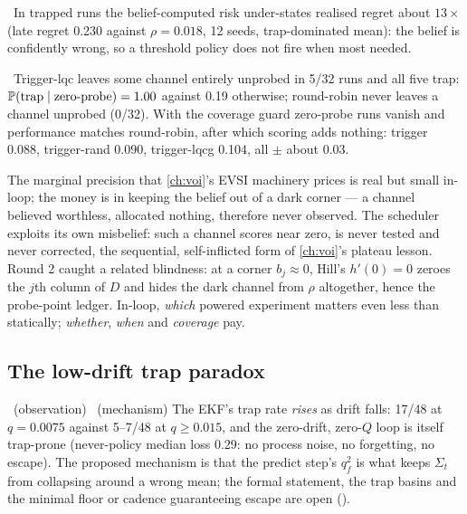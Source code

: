 \begin{proposition}
\label{fusion:prop:ledger}
\tagNumerical\ In trapped runs the belief-computed risk under-states realised regret about $13\times$ (late regret 0.230 against $\rho = 0.018$, 12 seeds, trap-dominated mean): the belief is confidently wrong, so a threshold policy does not fire when most needed.
\end{proposition}

\begin{proposition}
\label{fusion:prop:selftrap}
\tagNumerical\ Trigger-lqc leaves some channel entirely unprobed in 5/32 runs and all five trap: $\mathbb{P}(\mathrm{trap}\mid\text{zero-probe}) = 1.00$ against 0.19 otherwise; round-robin never leaves a channel unprobed (0/32). With the coverage guard zero-probe runs vanish and performance matches round-robin, after which scoring adds nothing: trigger 0.088, trigger-rand 0.090, trigger-lqcg 0.104, all $\pm$ about 0.03.
\end{proposition}

The marginal precision that \cref{ch:voi}'s EVSI machinery prices is real but small in-loop; the money is in keeping the belief out of a dark corner --- a channel believed worthless, allocated nothing, therefore never observed. The scheduler exploits its own misbelief: such a channel scores near zero, is never tested and never corrected, the sequential, self-inflicted form of \cref{ch:voi}'s plateau lesson. Round 2 caught a related blindness: at a corner $b_j \approx 0$, Hill's $h'(0) = 0$ zeroes the $j$th column of $D$ and hides the dark channel from $\rho$ altogether, hence the probe-point ledger. In-loop, \emph{which} powered experiment matters even less than statically; \emph{whether}, \emph{when} and \emph{coverage} pay.

\subsection{The low-drift trap paradox}

\begin{conjecture}
\label{fusion:conj:paradox}
\tagNumerical\ (observation) \tagConjecture\ (mechanism) The EKF's trap rate \emph{rises} as drift falls: 17/48 at $q = 0.0075$ against 5--7/48 at $q \ge 0.015$, and the zero-drift, zero-$Q$ loop is itself trap-prone (never-policy median loss 0.29: no process noise, no forgetting, no escape). The proposed mechanism is that the predict step's $q_f^2$ is what keeps $\Sigma_t$ from collapsing around a wrong mean; the formal statement, the trap basins and the minimal floor or cadence guaranteeing escape are open ().
\end{conjecture}

